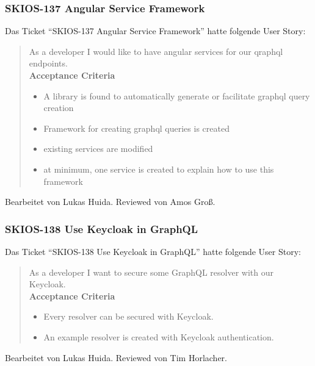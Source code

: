 \subsubsection{SKIOS-137 Angular Service Framework}
Das Ticket \enquote{SKIOS-137 Angular Service Framework} hatte folgende User Story:
\begin{quotation}
    As a developer I would like to have angular services for our qraphql endpoints. \\
\textbf{Acceptance Criteria}
\begin{itemize}
    \item A library is found to automatically generate or facilitate graphql query creation
    \item Framework for creating graphql queries is created
    \item existing services are modified
    \item at minimum, one service is created to explain how to use this framework
\end{itemize}
\end{quotation}
Bearbeitet von Lukas Huida.
Reviewed von Amos Groß.

\subsubsection{SKIOS-138 Use Keycloak in GraphQL}
Das Ticket \enquote{SKIOS-138 Use Keycloak in GraphQL} hatte folgende User Story:
\begin{quotation}
    As a developer I want to secure some GraphQL resolver with our Keycloak. \\
    \textbf{Acceptance Criteria}
    \begin{itemize}
        \item Every resolver can be secured with Keycloak.
        \item An example resolver is created with Keycloak authentication.
    \end{itemize}
\end{quotation}
Bearbeitet von Lukas Huida.
Reviewed von Tim Horlacher.

